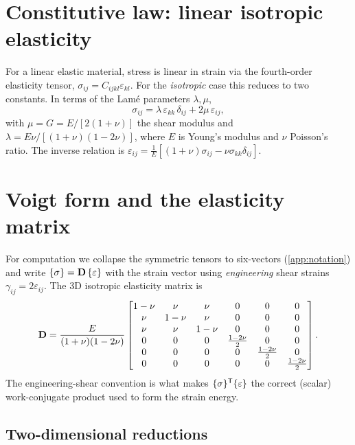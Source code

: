 \section{Constitutive law: linear isotropic elasticity}

For a linear elastic material, stress is linear in strain via the
fourth-order elasticity tensor, $\sigma_{ij}=C_{ijkl}\varepsilon_{kl}$.
For the \emph{isotropic} case this reduces to two constants. In terms of
the Lam\'e parameters $\lambda,\mu$,
\begin{equation}
  \sigma_{ij} = \lambda\,\varepsilon_{kk}\,\delta_{ij} + 2\mu\,\varepsilon_{ij},
  \label{eq:hooke}
\end{equation}
with $\mu=G=E/[2(1+\nu)]$ the shear modulus and
$\lambda=E\nu/[(1+\nu)(1-2\nu)]$, where $E$ is Young's modulus and $\nu$
Poisson's ratio. The inverse relation is
$\varepsilon_{ij}=\tfrac{1}{E}[(1+\nu)\sigma_{ij}-\nu\sigma_{kk}\delta_{ij}]$.

\section{Voigt form and the elasticity matrix}

For computation we collapse the symmetric tensors to six-vectors
(\cref{app:notation}) and write $\{\sigma\}=\mathbf{D}\,\{\varepsilon\}$ with the strain
vector using \emph{engineering} shear strains $\gamma_{ij}=2\varepsilon_{ij}$.
The 3D isotropic elasticity matrix is
\begin{equation}
  \mathbf{D} = \frac{E}{(1+\nu)(1-2\nu)}
  \begin{bmatrix}
    1-\nu & \nu & \nu & 0 & 0 & 0\\
    \nu & 1-\nu & \nu & 0 & 0 & 0\\
    \nu & \nu & 1-\nu & 0 & 0 & 0\\
    0 & 0 & 0 & \tfrac{1-2\nu}{2} & 0 & 0\\
    0 & 0 & 0 & 0 & \tfrac{1-2\nu}{2} & 0\\
    0 & 0 & 0 & 0 & 0 & \tfrac{1-2\nu}{2}
  \end{bmatrix}.
  \label{eq:Dmat3d}
\end{equation}
The engineering-shear convention is what makes $\{\sigma\}^{\mathsf{T}}\{\varepsilon\}$ the
correct (scalar) work-conjugate product used to form the strain energy.

\subsection{Two-dimensional reductions}

